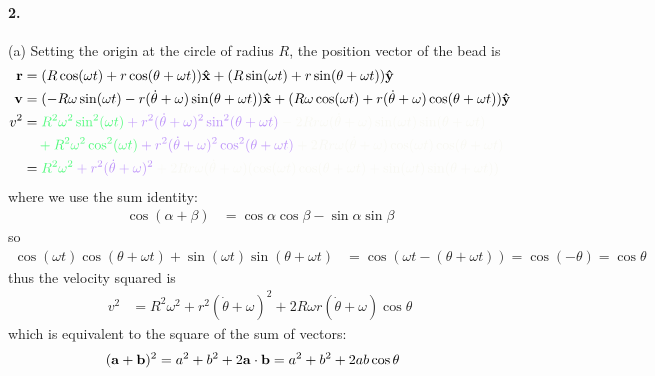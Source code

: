 \documentclass[../hw.tex]{subfiles}
\begin{document}
\paragraph*{2.} (a) Setting the origin at the circle of radius $R$, the position vector of the bead is
\begin{align*}
    \vb r &= (R\cos(\omega t) + r\cos(\theta + \omega t))\vu x + (R\sin(\omega t) + r\sin(\theta + \omega t))\vu y \\
    \vb v &= (-R\omega\sin(\omega t) - r(\dot \theta + \omega)\sin(\theta + \omega t))\vu x
        + (R\omega\cos(\omega t) + r(\dot \theta + \omega)\cos(\theta + \omega t))\vu y \\
    v^2 &= \color{draculagreen}
                R^2 \omega^2 \sin^2(\omega t) 
        \color{draculapurple} 
            + r^2 (\dot \theta + \omega)^2 \sin^2(\theta + \omega t)
        \color{draculafg} 
            - 2Rr\omega(\dot \theta + \omega)\sin(\omega t)\sin(\theta + \omega t) \\
    &\quad \color{draculagreen} 
                + R^2\omega^2\cos^2(\omega t) 
        \color{draculapurple} 
            + r^2(\dot \theta + \omega)^2 \cos^2(\theta + \omega t)
        \color{draculafg}
            + 2Rr\omega(\dot \theta + \omega)\cos(\omega t)\cos(\theta + \omega t) \\
    &= \color{draculagreen}
            R^2 \omega^2
        \color{draculapurple}
            + r^2 (\dot \theta + \omega)^2 
        \color{draculafg}
            + 2Rr\omega(\dot \theta + \omega)
                (\cos(\omega t) \cos(\theta + \omega t) + \sin(\omega t) \sin(\theta + \omega t))
\end{align*}
where we use the sum identity:
\begin{align*}
    \cos(\alpha + \beta) &= \cos\alpha\cos\beta - \sin\alpha\sin\beta
\end{align*}
so 
\begin{align*}
    \cos(\omega t) \cos(\theta + \omega t) + \sin(\omega t) \sin(\theta + \omega t) &= 
        \cos(\omega t - (\theta + \omega t)) = \cos(-\theta) = \cos\theta
\end{align*}
thus the velocity squared is
\begin{align*}
    v^2 &= R^2 \omega^2 + r^2 (\dot \theta + \omega)^2 + 2R\omega r(\dot \theta + \omega)\cos\theta
\end{align*}
which is equivalent to the square of the sum of vectors:
\begin{align*}
    (\vb a + \vb b)^2 &= a^2 + b^2 + 2\vb a \cdot \vb b = a^2 + b^2 + 2ab\cos\theta
\end{align*}
\end{document}
